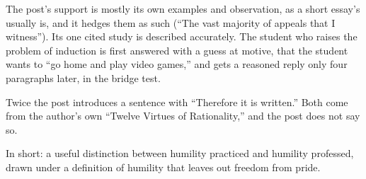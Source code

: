 \begin{afterword}
The post's support is mostly its own examples and observation, as a short essay's usually is, and it hedges them as such (``The vast majority of appeals that I witness''). Its one cited study is described accurately. The student who raises the problem of induction is first answered with a guess at motive, that the student wants to ``go home and play video games,'' and gets a reasoned reply only four paragraphs later, in the bridge test.

Twice the post introduces a sentence with ``Therefore it is written.'' Both come from the author's own ``Twelve Virtues of Rationality,'' and the post does not say so.

In short: a useful distinction between humility practiced and humility professed, drawn under a definition of humility that leaves out freedom from pride.
\end{afterword}
